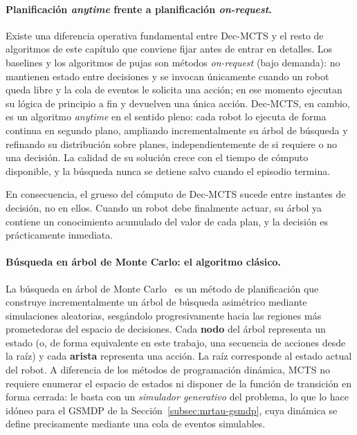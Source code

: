 \paragraph{Planificación \textit{anytime} frente a planificación \textit{on-request}.}
Existe una diferencia operativa fundamental entre Dec-MCTS y el resto de algoritmos de este capítulo que conviene fijar antes de entrar en detalles. Los baselines y los algoritmos de pujas son métodos \emph{on-request} (bajo demanda): no mantienen estado entre decisiones y se invocan únicamente cuando un robot queda libre y la cola de eventos le solicita una acción; en ese momento ejecutan su lógica de principio a fin y devuelven una única acción. Dec-MCTS, en cambio, es un algoritmo \emph{anytime} en el sentido pleno: cada robot lo ejecuta de forma continua en segundo plano, ampliando incrementalmente su árbol de búsqueda y refinando su distribución sobre planes, independientemente de si requiere o no una decisión. La calidad de su solución crece con el tiempo de cómputo disponible, y la búsqueda nunca se detiene salvo cuando el episodio termina.

En consecuencia, el grueso del cómputo de Dec-MCTS sucede entre instantes de decisión, no en ellos. Cuando un robot debe finalmente actuar, su árbol ya contiene un conocimiento acumulado del valor de cada plan, y la decisión es prácticamente inmediata.

\paragraph{Búsqueda en árbol de Monte Carlo: el algoritmo clásico.}
La búsqueda en árbol de Monte Carlo~\cite{browne2012survey} es un método de planificación que construye incrementalmente un árbol de búsqueda asimétrico mediante simulaciones aleatorias, sesgándolo progresivamente hacia las regiones más prometedoras del espacio de decisiones. Cada \textbf{nodo} del árbol representa un estado (o, de forma equivalente en este trabajo, una secuencia de acciones desde la raíz) y cada \textbf{arista} representa una acción. La raíz corresponde al estado actual del robot. A diferencia de los métodos de programación dinámica, MCTS no requiere enumerar el espacio de estados ni disponer de la función de transición en forma cerrada: le basta con un \emph{simulador generativo} del problema, lo que lo hace idóneo para el GSMDP de la Sección~\ref{subsec:mrtau-gsmdp}, cuya dinámica se define precisamente mediante una cola de eventos simulables.

